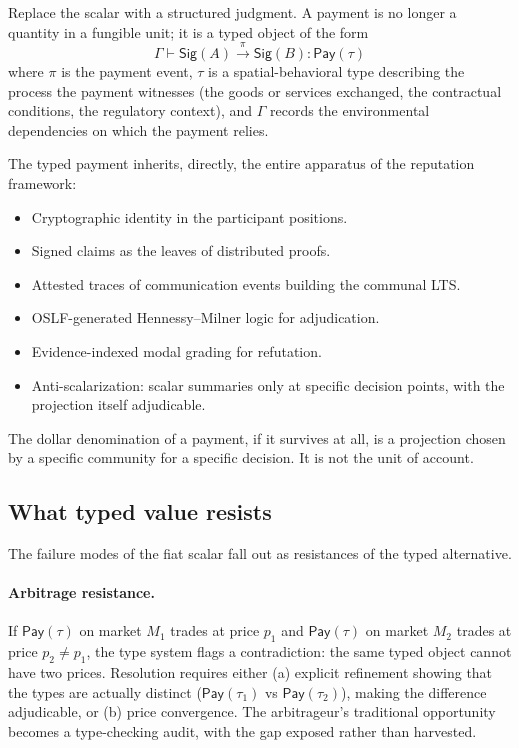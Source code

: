 \documentclass[11pt]{article}
\newcommand{\Sig}{\mathsf{Sig}}
\newcommand{\Pay}{\mathsf{Pay}}
\begin{document}
Replace the scalar with a structured judgment. A payment is no longer a quantity in a fungible unit; it is a typed object of the form
\[
\Gamma \vdash \Sig(A) \xrightarrow{\pi} \Sig(B) : \Pay(\tau)
\]
where $\pi$ is the payment event, $\tau$ is a spatial-behavioral type describing the process the payment witnesses (the goods or services exchanged, the contractual conditions, the regulatory context), and $\Gamma$ records the environmental dependencies on which the payment relies.

The typed payment inherits, directly, the entire apparatus of the reputation framework:
\begin{itemize}[leftmargin=*]
\item Cryptographic identity in the participant positions.
\item Signed claims as the leaves of distributed proofs.
\item Attested traces of communication events building the communal LTS.
\item OSLF-generated Hennessy--Milner logic for adjudication.
\item Evidence-indexed modal grading for refutation.
\item Anti-scalarization: scalar summaries only at specific decision points, with the projection itself adjudicable.
\end{itemize}

The dollar denomination of a payment, if it survives at all, is a projection chosen by a specific community for a specific decision. It is not the unit of account.

\subsection{What typed value resists}\label{sec:resistances}

The failure modes of the fiat scalar fall out as resistances of the typed alternative.

\paragraph{Arbitrage resistance.} If $\Pay(\tau)$ on market $M_1$ trades at price $p_1$ and $\Pay(\tau)$ on market $M_2$ trades at price $p_2 \neq p_1$, the type system flags a contradiction: the same typed object cannot have two prices. Resolution requires either (a) explicit refinement showing that the types are actually distinct ($\Pay(\tau_1)$ vs $\Pay(\tau_2)$), making the difference adjudicable, or (b) price convergence. The arbitrageur's traditional opportunity becomes a type-checking audit, with the gap exposed rather than harvested.
\end{document}
